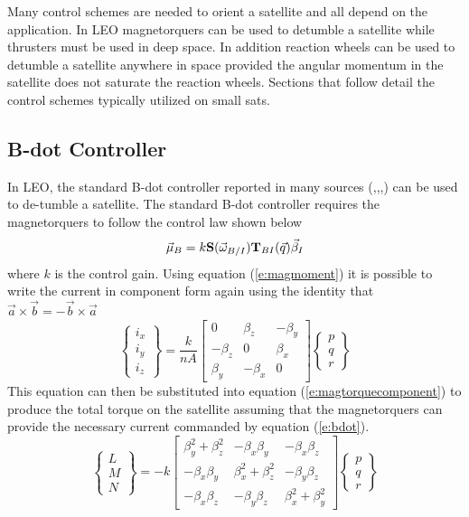 \documentclass{article}
\begin{document}
Many control schemes are needed to orient a satellite and all depend
on the application. In LEO magnetorquers can be used to detumble a
satellite while thrusters must be used in deep space. In addition
reaction wheels can be used to detumble a satellite anywhere in space
provided the angular momentum in the satellite does not saturate the
reaction wheels. Sections that follow detail the control schemes
typically utilized on small sats. 

\subsection{B-dot Controller}

In LEO, the standard B-dot controller reported in many sources
(\cite{Leomanni2012},\cite{Lovera2015},\cite{WInstitute},\cite{SanyalDick})
can be used to de-tumble a satellite. The standard B-dot controller
requires the magnetorquers to follow the control law shown below
\begin{equation}\label{e:bdotcompact}
  \vec{\mu}_B = k{\bf S}(\vec{\omega}_{B/I}){\bf T}_{BI}(\vec{q})\vec{\beta}_I
\end{equation}
where $k$ is the control gain. Using equation (\ref{e:magmoment}) it
is possible to write the current in component form again
using the identity that $\vec{a}\times\vec{b}=-\vec{b}\times\vec{a}$
\begin{equation}\label{e:bdot}
  \begin{Bmatrix} i_{x}
    \\ i_{y} \\ i_{z} \end{Bmatrix} = \frac{k}{nA}\begin{bmatrix} 0 & \beta_z & -\beta_y \\ -\beta_z & 0 &
  \beta_x \\ \beta_y & -\beta_x & 0 \end{bmatrix}\begin{Bmatrix} p
    \\ q \\ r \end{Bmatrix}
\end{equation}
This equation can then be substituted into equation
(\ref{e:magtorquecomponent}) to produce the total torque on the
satellite assuming that the magnetorquers can provide the necessary
current commanded by equation (\ref{e:bdot}).
\begin{equation}\label{e:bdotfinal}
  \begin{Bmatrix} L \\ M \\ N \end{Bmatrix} = -k \begin{bmatrix}
    \beta_y^2 + \beta_z^2 & -\beta_x\beta_y & -\beta_x\beta_z
    \\ -\beta_x\beta_y & \beta_x^2 + \beta_z^2 & -\beta_y\beta_z \\
    -\beta_x\beta_z & -\beta_y\beta_z & \beta_x^2 +
    \beta_y^2 \end{bmatrix} \begin{Bmatrix} p
    \\ q \\ r \end{Bmatrix} 
\end{equation}
\end{document}
